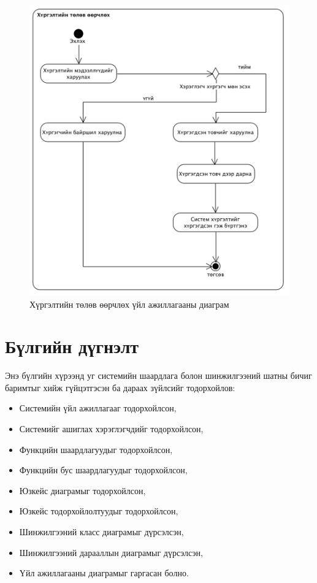 \begin{figure}[H]
  \centering
	\includegraphics[width=\textwidth]{Figures/shinjilgee/activity/hurgeltiin_tolov_oorchloh.png}
	\caption{Хүргэлтийн төлөв өөрчлөх үйл ажиллагааны диаграм}
\end{figure}


\section{Бүлгийн дүгнэлт}
Энэ бүлгийн хүрээнд уг системийн шаардлага болон шинжилгээний шатны бичиг баримтыг хийж гүйцэтгэсэн ба дараах зүйлсийг тодорхойлов:
\begin{itemize}[label={--}]
    \renewcommand\labelitemi{--}
    \item Системийн үйл ажиллагааг тодорхойлсон,
    \item Системийг ашиглах хэрэглэгчдийг тодорхойлсон,
    \item Функцийн шаардлагуудыг тодорхойлсон,
    \item Функцийн бус шаардлагуудыг тодорхойлсон,
    \item Юзкейс диаграмыг тодорхойлсон,
    \item Юзкейс тодорхойлолтуудыг тодорхойлсон,
    \item Шинжилгээний класс диаграмыг дүрсэлсэн,
    \item Шинжилгээний дарааллын диаграмыг дүрсэлсэн,
    \item Үйл ажиллагааны диаграмыг гаргасан болно.
\end{itemize}